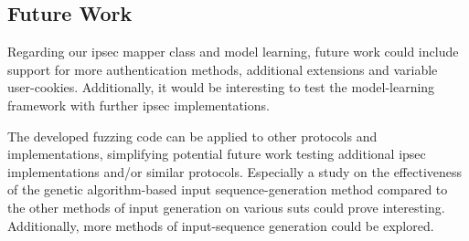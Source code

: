 \subsection{Future Work}
Regarding our \ac{ipsec} mapper class and model learning, future work could include support for more authentication methods, additional extensions and variable user-cookies. Additionally, it would be interesting to test the model-learning framework with further \ac{ipsec} implementations.

The developed fuzzing code can be applied to other protocols and implementations, simplifying potential future work testing additional \ac{ipsec} implementations and/or similar protocols. Especially a study on the effectiveness of the genetic algorithm-based input sequence-generation method compared to the other methods of input generation on various \acp{sut} could prove interesting. Additionally, more methods of input-sequence generation could be explored.